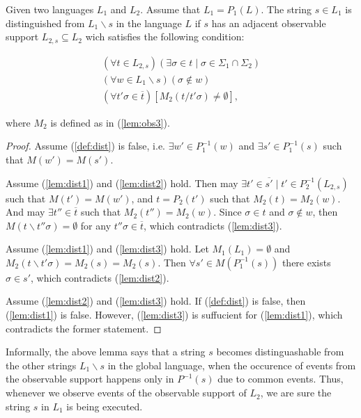 \documentclass[a4paper, 10pt, conference]{ieeeconf}
\begin{document}
\begin{lemma}
\label{lem:distinguished}
Given two languages $L_1$ and $L_2$. Assume that $L_1 = P_1(L)$. The string $s
\in L_1$ is distinguished from $L_1\backslash s$ in the language $L$ if $s$ has
an adjacent observable support $L_{2,s} \subseteq L_2$ wich satisfies the
following condition:
\end{lemma}
\begin{subequations}
\begin{align}
	(\forall t \in L_{2,s})
	(\exists \sigma \in t \mid \sigma \in \Sigma_1 \cap \Sigma_2)
	\label{lem:dist1}
	\\
	(\forall w \in L_1\backslash s)(\sigma \not \in w)
	\label{lem:dist2}
	\\
	(\forall t'\sigma \in \overline{t})
	[M_2(t / t'\sigma) \neq \emptyset]
	\label{lem:dist3},
\end{align}
\end{subequations}

where $M_2$ is defined as in (\ref{lem:obs3}). 

\begin{proof}
Assume (\ref{def:dist}) is false, i.e. $\exists w' \in P_1^{-1}(w)$ and $\exists
s' \in P_1^{-1}(s)$ such that $M(w') = M(s')$. 

Assume (\ref{lem:dist1}) and (\ref{lem:dist2}) hold. Then may $\exists t' \in
\overline{s'} \mid t' \in P_2^{-1}(L_{2,s})$ such that $M(t') = M(w')$, and $t =
P_2(t')$ such that $M_2(t) = M_2(w)$. And may $\exists t'' \in \overline{t}$
such that $M_2(t'') = M_2(w)$. Since $\sigma \in t$ and $\sigma \not \in w$,
then $M(t \backslash t''\sigma) = \emptyset$ for any $t''\sigma \in
\overline{t}$, which contradicts (\ref{lem:dist3}).

Assume (\ref{lem:dist1}) and (\ref{lem:dist3}) hold. Let $M_1(L_1) = \emptyset$
and $M_2(t\backslash t'\sigma) = M_2(s) = M_2(s)$. Then $\forall s' \in
M(P_1^{-1}(s))$ there exists $\sigma \in s'$, which contradicts
(\ref{lem:dist2}).

Assume (\ref{lem:dist2}) and (\ref{lem:dist3}) hold. If (\ref{def:dist}) is
false, then (\ref{lem:dist1}) is false. However, (\ref{lem:dist3}) is suffucient
for (\ref{lem:dist1}), which contradicts the former statement.
\end{proof}

Informally, the above lemma says that a string $s$ becomes distinguashable from
the other strings $L_1\backslash s$ in the global language, when the occurence
of events from the observable support happens only in $P^{-1}(s)$ due to
common events. Thus, whenever we observe events of the observable support of
$L_2$, we are sure the string $s$ in $L_1$ is being executed.
\end{document}

